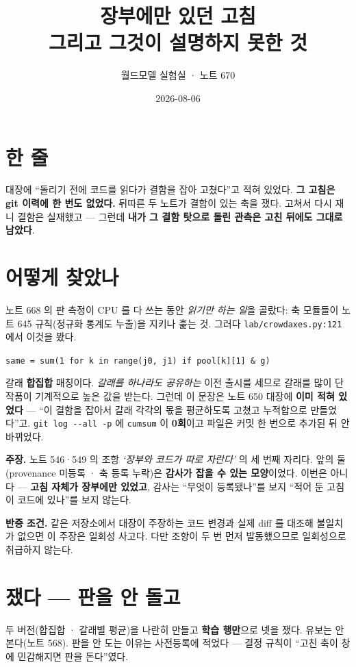 \documentclass[10pt,a4paper]{article}
\title{\bfseries 장부에만 있던 고침\\[2pt]
\large 그리고 그것이 설명하지 못한 것}
\author{월드모델 실험실 · 노트 670}
\date{2026-08-06}
\newcommand{\claim}[2]{\begin{claimbox}\textbf{주장.} #1\par\smallskip
  \textcolor{gray!70}{\textbf{반증 조건.} #2}\end{claimbox}}
\begin{document}
\maketitle

\section{한 줄}

대장에 ``돌리기 전에 코드를 읽다가 결함을 잡아 고쳤다''고 적혀 있었다. \textbf{그
고침은 git 이력에 한 번도 없었다.} 뒤따른 두 노트가 결함이 있는 축을 쟀다. 고쳐서
다시 재니 결함은 실재했고 --- 그런데 \textbf{내가 그 결함 탓으로 돌린 관측은
고친 뒤에도 그대로 남았다}.

\section{어떻게 찾았나}

노트 668 의 판 측정이 CPU 를 다 쓰는 동안 \emph{읽기만 하는 일}을 골랐다: 축
모듈들이 노트 645 규칙(정규화 통계도 누출)을 지키나 훑는 것. 그러다
\verb|lab/crowdaxes.py:121| 에서 이것을 봤다.

\begin{center}
\verb|same = sum(1 for k in range(j0, j1) if pool[k][1] & g)|
\end{center}

갈래 \textbf{합집합} 매칭이다. \emph{갈래를 하나라도 공유하는} 이전 출시를 세므로
갈래를 많이 단 작품이 기계적으로 높은 값을 받는다. 그런데 이 문장은 노트 650 대장에
\textbf{이미 적혀 있었다} --- ``이 결함을 잡아서 갈래 각각의 몫을 평균하도록 고쳤고
누적합으로 만들었다''고. \verb|git log --all -p| 에 \verb|cumsum| 이 \textbf{0회}이고
파일은 커밋 한 번으로 추가된 뒤 안 바뀌었다.

\claim{노트 546·549 의 조항 \emph{`장부와 코드가 따로 자란다'} 의 세 번째 자리다.
앞의 둘(provenance 미등록 · 축 등록 누락)은 \textbf{감사가 잡을 수 있는 모양}이었다.
이번은 아니다 --- \textbf{고침 자체가 장부에만 있었고}, 감사는 ``무엇이 등록됐나''를
보지 ``적어 둔 고침이 코드에 있나''를 보지 않는다.}
{같은 저장소에서 대장이 주장하는 코드 변경과 실제 diff 를 대조해 불일치가
없으면 이 주장은 일회성 사고다. 다만 조항이 두 번 먼저 발동했으므로 일회성으로
취급하지 않는다.}

\section{쟀다 --- 판을 안 돌고}

두 버전(합집합 · 갈래별 평균)을 나란히 만들고 \textbf{학습 행만}으로 넷을 쟀다.
유보는 안 본다(노트 568). 판을 안 도는 이유는 사전등록에 적었다 --- 결정 규칙이
``고친 축이 창에 민감해지면 판을 돈다''였다.
\end{document}
